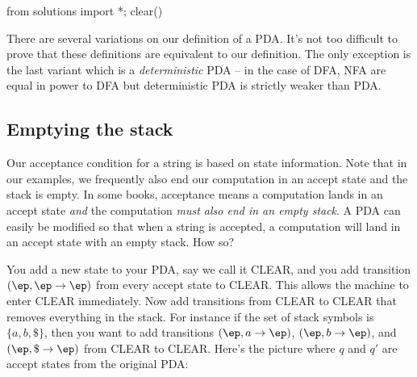 \begin{python0}
from solutions import *; clear()
\end{python0}

There are several variations on our definition of a PDA. 
It's not too difficult to prove that these definitions are equivalent to our 
definition.
The only exception is the last variant which is a
\textit{deterministic} PDA --
in the case of DFA, NFA are equal in power to DFA but
deterministic PDA is strictly weaker than PDA.

\newpage
\subsection{Emptying the stack}

Our acceptance condition for a string is based on state information.
Note that in our examples, we frequently also end our computation in an
accept state and the stack is empty.
In some books, acceptance means a computation lands in an accept state 
\textit{ and} the computation \textit{must also end in an empty stack}.
A PDA can easily be modified so that when a string is accepted, a computation
will land in an accept state with an empty stack.
How so?

You add a new state to your PDA, say we call it CLEAR, and you add
transition $(\ep, \ep \rightarrow \ep)$ from every accept state to CLEAR.
This allows the machine to enter CLEAR immediately.
Now add transitions from CLEAR to CLEAR that removes everything in the stack.
For instance if the set of stack symbols is $\{a, b, \$\}$, then you want to 
add transitions $(\ep, a \rightarrow \ep)$, $(\ep, b \rightarrow \ep)$,
and $(\ep, \$ \rightarrow \ep)$ from CLEAR to CLEAR.
Here's the picture where $q$ and $q'$ are accept states from the original PDA:

\begin{center}
\end{center}
    

